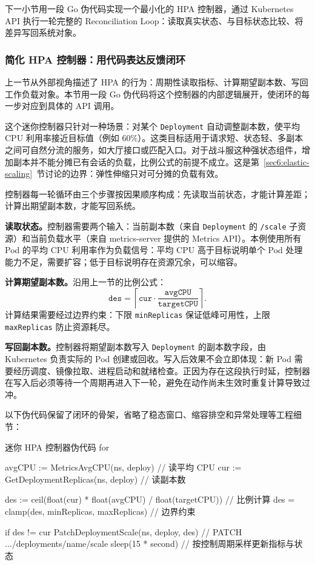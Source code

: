 下一小节用一段 Go 伪代码实现一个最小化的 HPA 控制器，通过 Kubernetes API 执行一轮完整的 Reconciliation Loop：读取真实状态、与目标状态比较、将差异写回系统对象。

\subsubsection{简化 HPA 控制器：用代码表达反馈闭环}
\label{sec6:mini-hpa-controller}
上一节从外部视角描述了 HPA 的行为：周期性读取指标、计算期望副本数、写回工作负载对象。本节用一段 Go 伪代码将这个控制器的内部逻辑展开，使闭环的每一步对应到具体的 API 调用。

这个迷你控制器只针对一种场景：对某个 \texttt{Deployment} 自动调整副本数，使平均 CPU 利用率接近目标值（例如 $60\%$）。这类目标适用于请求短、状态轻、多副本之间可自然分流的服务，如大厅接口或匹配入口。对于战斗服这种强状态组件，增加副本并不能分摊已有会话的负载，比例公式的前提不成立。这是第~\ref{sec6:elastic-scaling}~节讨论的边界：弹性伸缩只对可分摊的负载有效。

控制器每一轮循环由三个步骤按因果顺序构成：先读取当前状态，才能计算差距；计算出期望副本数，才能写回系统。

\textbf{读取状态。}控制器需要两个输入：当前副本数（来自 \texttt{Deployment} 的 \texttt{/scale} 子资源）和当前负载水平（来自 metrics-server 提供的 Metrics API）。本例使用所有 Pod 的平均 CPU 利用率作为负载信号：平均 CPU 高于目标说明单个 Pod 处理能力不足，需要扩容；低于目标说明存在资源冗余，可以缩容。

\textbf{计算期望副本数。}沿用上一节的比例公式：
\[
\texttt{des}=\left\lceil \texttt{cur}\cdot\frac{\texttt{avgCPU}}{\texttt{targetCPU}}\right\rceil.
\]
计算结果需要经过边界约束：下限 \texttt{minReplicas} 保证低峰可用性，上限 \texttt{maxReplicas} 防止资源耗尽。

\textbf{写回副本数。}控制器将期望副本数写入 \texttt{Deployment} 的副本数字段，由 Kubernetes 负责实际的 Pod 创建或回收。写入后效果不会立即体现：新 Pod 需要经历调度、镜像拉取、进程启动和就绪检查。正因为存在这段执行时延，控制器在写入后必须等待一个周期再进入下一轮，避免在动作尚未生效时重复计算导致过冲。

以下伪代码保留了闭环的骨架，省略了稳态窗口、缩容排空和异常处理等工程细节：

\begin{pseudocodebox}{迷你 HPA 控制器伪代码}
for {
    avgCPU := MetricsAvgCPU(ns, deploy)         // 读平均 CPU
    cur    := GetDeploymentReplicas(ns, deploy) // 读副本数

    des := ceil(float(cur) * float(avgCPU) /
                float(targetCPU))              // 比例计算
    des = clamp(des, minReplicas,
                maxReplicas)                   // 边界约束

    if des != cur {
        PatchDeploymentScale(ns, deploy, des)  // PATCH .../deployments/{name}/scale
    }
    sleep(15 * second) // 按控制周期采样更新指标与状态
}
\end{pseudocodebox}

